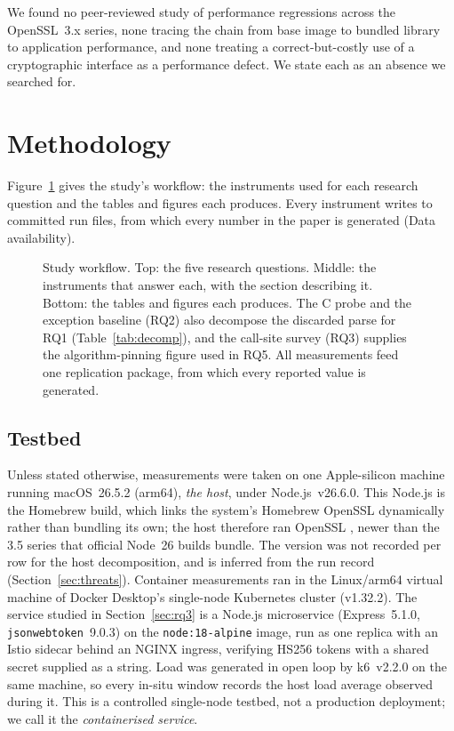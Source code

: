 \documentclass[preprint,12pt,authoryear]{elsarticle}
\newcommand{\LibraryName}{\texttt{jsonwebtoken}}
\begin{document}
We found no peer-reviewed study of performance regressions across the
OpenSSL~3.x series, none tracing the chain from base image to bundled library
to application performance, and none treating a correct-but-costly use of a
cryptographic interface as a performance defect. We state each as an absence
we searched for.

\section{Methodology}\label{sec:method}

Figure~\ref{fig:workflow} gives the study's workflow: the instruments used for
each research question and the tables and figures each produces. Every
instrument writes to committed run files, from which every number in the paper
is generated (Data availability).

\begin{figure}[!t]
\centering
\resizebox{\linewidth}{!}{}
\caption{Study workflow. Top: the five research questions. Middle: the
instruments that answer each, with the section describing it. Bottom: the
tables and figures each produces. The C probe and the exception baseline
(RQ2) also decompose the discarded parse for RQ1 (Table~\ref{tab:decomp}),
and the call-site survey (RQ3) supplies the algorithm-pinning figure used in
RQ5. All measurements feed one replication package, from which every reported
value is generated.}
\label{fig:workflow}
\end{figure}

\subsection{Testbed}\label{sec:testbed}

Unless stated otherwise, measurements were taken on one Apple-silicon machine
running macOS~26.5.2 (arm64), \emph{the host}, under Node.js~v26.6.0. This
Node.js is the Homebrew build, which links the system's Homebrew OpenSSL
dynamically rather than bundling its own; the host therefore ran OpenSSL
\HostOpensslInferred, newer than the 3.5 series that official Node~26 builds
bundle. The version was not recorded per row for the host decomposition, and
is inferred from the run record (Section~\ref{sec:threats}). Container
measurements ran in the Linux/arm64 virtual machine of Docker Desktop's
single-node Kubernetes cluster (v1.32.2). The service studied in
Section~\ref{sec:rq3} is a Node.js microservice (Express~5.1.0,
\LibraryName{}~9.0.3) on the \texttt{node:18-alpine} image, run as one replica
with an Istio sidecar behind an NGINX ingress, verifying HS256 tokens with a
shared secret supplied as a string. Load was generated in open loop by
k6~v2.2.0 on the same machine, so every in-situ window records the host load
average observed during it. This is a controlled single-node testbed, not a
production deployment; we call it the \emph{containerised service}.
\end{document}
